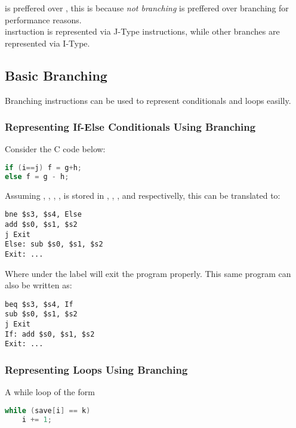 \documentclass[11pt,a4paper,twocolumn]{book}
\begin{document}
 is preffered over , this is because \textit{not branching} is preffered over branching for performance reasons.\\

 insrtuction is represented via J-Type instructions, while other branches are represented via I-Type.\\

\subsection{Basic Branching}

Branching instructions can be used to represent conditionals and loops easilly.

\subsubsection{Representing If-Else Conditionals Using Branching}


Consider the C code below:

\begin{lstlisting}[language=C]
if (i==j) f = g+h;
else f = g - h;
\end{lstlisting}

Assuming , , , ,  is stored in , , ,  and  respectivelly, this can be translated to:

\begin{lstlisting}
bne $s3, $s4, Else
add $s0, $s1, $s2
j Exit
Else: sub $s0, $s1, $s2
Exit: ...
\end{lstlisting}

Where under the label  will exit the program properly. This same program can also be written as:

\begin{lstlisting}
beq $s3, $s4, If
sub $s0, $s1, $s2
j Exit
If: add $s0, $s1, $s2
Exit: ...
\end{lstlisting}

\subsubsection{Representing Loops Using Branching}

A while loop of the form

\begin{lstlisting}[language=C]
while (save[i] == k)
	i += 1;
\end{lstlisting}
\end{document}
